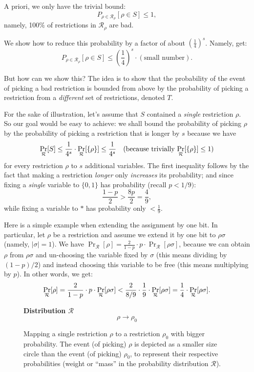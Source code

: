 A priori, we only have the trivial bound:
\[
P_{\rho \in \mathcal{R}_{\rho}}[\rho \in S] \leq 1,
\]
namely, 100\% of restrictions in \( \mathcal{R}_{\rho} \) are bad.

We show how to reduce this probability by a factor of about \( \left( \frac{1}{4} \right)^s \).
Namely, get:
\[
P_{\rho \in \mathcal{R}_{\rho}}[\rho \in S] \leq \left( \frac{1}{4} \right)^s \cdot (\text{small number}).
\]

But how can we show this?
The idea is to show that the probability of the event of picking a bad restriction 
is bounded from above by the probability of picking a restriction from a \emph{different} 
set of restrictions, denoted \( T \).

For the sake of illustration, let's assume that  \( S \) contained a \emph{single} restriction \( \rho \). So our goal would be easy to achieve: we shall bound the probability of picking $\rho$ by the probability of picking a restriction that is longer by  $s$ 
 because we have 
\[
\Pr_{\mathcal{R}}[S] \leq \frac{1}{4^s}\cdot \Pr_{\mathcal{R}}[\{\rho\}] \leq \frac{1}{4^s} 
\quad \text{(because trivially \( \Pr_{\mathcal{R}}[\{\rho\}] \leq 1\))}
\]
for every restriction \( \rho \) to \( s \) additional variables.
The first inequality follows by the fact that making a restriction \emph{longer} 
only \emph{increases} its probability; and  since fixing a \emph{single} variable 
to \( \{0,1\} \) has probability (recall  $p<1/9)$: 
\[
\frac{1 - p}{2} > \frac{8p}{2} = \frac{4}{9},
\]
while fixing a variable to \( * \) has probability only \( < \frac{1}{9} \).

Here is a simple example when extending the assignment by one bit. In particular, let $\rho$ be a restriction and assume we extend it by one bit to $\rho\sigma$ (namely, $|\sigma|=1$). We have 
$\Pr_{\mathcal{R}}[\rho] = \frac{2}{1 - p} \cdot p \cdot \Pr_{\mathcal{R}}[\rho\sigma]$, because we can obtain $\rho$ from $\rho\sigma$ and un-choosing the variable  fixed by $\sigma$ (this means dividing by $(1-p)/2$) and instead choosing this variable to be free (this means multiplying by $p$). In other words, we get:  
\[
\Pr_{\mathcal{R}}[\rho] = \frac{2}{1 - p} \cdot p \cdot \Pr_{\mathcal{R}}[\rho\sigma] 
<  \frac{2}{8/9} \cdot \frac{1}{9} \cdot\Pr_{\mathcal{R}}
[\rho\sigma] = \frac{1}{4}\cdot
 \Pr_{\mathcal{R}}[\rho\sigma].
\]

\begin{figure}
\centering
\textbf{Distribution \( \mathcal{R} \)}
\[
\rho \longrightarrow \rho_0
\]
\caption{Mapping a single restriction \( \rho \) to a restriction \( \rho_0 \) with bigger probability.
The event (of picking) \( \rho \) is depicted as a smaller size circle than the event (of picking) \( \rho_0 \),
to represent their respective probabilities (weight or ``mass'' in the probability distribution \( \mathcal{R} \)).}
\end{figure}
 

